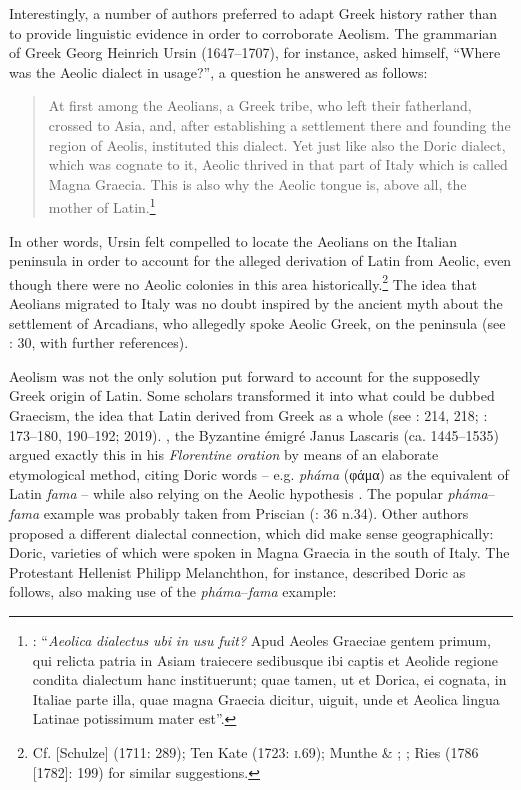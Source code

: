 Interestingly, a number of authors preferred to adapt Greek history rather than to provide linguistic evidence in order to corroborate Aeolism. The grammarian of Greek Georg Heinrich Ursin (1647–1707), for instance, asked himself, “Where was the Aeolic dialect in usage?”, a question he answered as follows:

\begin{quote}
At first among the Aeolians, a Greek tribe, who left their fatherland, crossed to Asia, and, after establishing a settlement there and founding the region of Aeolis, instituted this dialect. Yet just like also the Doric dialect, which was cognate to it, Aeolic thrived in that part of Italy which is called Magna Graecia. This is also why the Aeolic tongue is, above all, the mother of Latin.\footnote{\citet[509]{Ursin1691}: “\textit{Aeolica} \textit{dialectus} \textit{ubi} \textit{in} \textit{usu} \textit{fuit?} Apud Aeoles Graeciae gentem primum, qui relicta patria in Asiam traiecere sedibusque ibi captis et Aeolide regione condita dialectum hanc instituerunt; quae tamen, ut et Dorica, ei cognata, in Italiae parte illa, quae magna Graecia dicitur, uiguit, unde et Aeolica lingua Latinae potissimum mater est”.}
\end{quote}

In other words, Ursin felt compelled to locate the Aeolians on the Italian peninsula in order to account for the alleged derivation of Latin from Aeolic, even though there were no Aeolic colonies in this area historically.\footnote{Cf. [Schulze] (1711: 289); Ten Kate (1723: \textsc{i}.69); Munthe \& \citet[30]{Heiberg1748}; \citet[89]{Facius1782}; Ries (1786 [1782]: 199) for similar suggestions.} The idea that Aeolians migrated to Italy was no doubt inspired by the ancient myth about the settlement of Arcadians, who allegedly spoke Aeolic Greek, on the peninsula (see \citealt{Lamers2019}: 30, with further references).

Aeolism was not the only solution put forward to account for the supposedly Greek origin of Latin. Some scholars transformed it into what could be dubbed Graecism, the idea that Latin derived from Greek as a whole (see \citealt{Tavoni1986}: 214, 218; \citealt{Lamers2015}: 173–180, 190–192; 2019). \citealt{In1493}, the Byzantine émigré Janus Lascaris (ca. 1445–1535) argued exactly this in his \textit{Florentine} \textit{oration} by means of an elaborate etymological method, citing Doric words – e.g. \textit{pháma} (φάμα) as the equivalent of Latin \textit{fama} – while also relying on the Aeolic hypothesis \citep[179]{Lamers2015}. The popular \textit{pháma}–\textit{fama} example was probably taken from Priscian (\citealt{Lamers2019}: 36 n.34). Other authors proposed a different dialectal connection, which did make sense geographically: Doric, varieties of which were spoken in Magna Graecia in the south of Italy. The Protestant Hellenist Philipp Melanchthon, for instance, described Doric as follows, also making use of the \textit{pháma}–\textit{fama} example:

